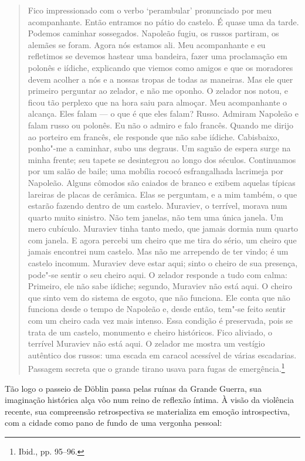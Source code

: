 \begin{quote}
Fico impressionado com o verbo `perambular' pronunciado por meu
acompanhante. Então entramos no pátio do castelo. É quase uma da tarde.
Podemos caminhar sossegados. Napoleão fugiu, os russos partiram, os
alemães se foram. Agora nós estamos ali. Meu acompanhante e eu
refletimos se devemos hastear uma bandeira, fazer uma proclamação em
polonês e iídiche, explicando que viemos como amigos e que os moradores
devem acolher a nós e a nossas tropas de todas as maneiras. Mas ele quer
primeiro perguntar ao zelador, e não me oponho. O zelador nos notou, e
ficou tão perplexo que na hora saiu para almoçar. Meu acompanhante o
alcança. Eles falam --- o que é que eles falam? Russo. Admiram Napoleão e
falam russo ou polonês. Eu não o admiro e falo francês. Quando me dirijo
ao porteiro em francês, ele responde que não sabe iídiche. Cabisbaixo,
ponho"-me a caminhar, subo uns degraus. Um saguão de espera surge na
minha frente; seu tapete se desintegrou ao longo dos séculos.
Continuamos por um salão de baile; uma mobília rococó esfrangalhada
lacrimeja por Napoleão. Alguns cômodos são caiados de branco e exibem
aquelas típicas lareiras de placas de cerâmica. Elas se perguntam, e a
mim também, o que estarão fazendo dentro de um castelo. Muraviev, o
terrível, morava num quarto muito sinistro. Não tem janelas, não tem uma
única janela. Um mero cubículo. Muraviev tinha tanto medo, que jamais
dormia num quarto com janela. E agora percebi um cheiro que me tira do
sério, um cheiro que jamais encontrei num castelo. Mas não me arrependo
de ter vindo; é um castelo incomum. Muraviev deve estar aqui; sinto o
cheiro de sua presença, pode"-se sentir o seu cheiro aqui. O zelador
responde a tudo com calma: Primeiro, ele não sabe iídiche; segundo,
Muraviev não está aqui. O cheiro que sinto vem do sistema de esgoto, que
não funciona. Ele conta que não funciona desde o tempo de Napoleão e,
desde então, tem"-se feito sentir com um cheiro cada vez mais intenso.
Essa condição é preservada, pois se trata de um castelo, monumento e
cheiro históricos. Fico aliviado, o terrível Muraviev não está aqui. O
zelador me mostra um vestígio autêntico dos russos: uma escada em
caracol acessível de várias escadarias. Passagem secreta que o grande
tirano usava para fugas de emergência.\footnote{Ibid., pp. 95--96.}
\end{quote}

Tão logo o passeio de Döblin passa pelas ruínas da Grande Guerra, sua
imaginação histórica alça vôo num reino de reflexão íntima. À visão da
violência recente, sua compreensão retrospectiva se materializa em
emoção introspectiva, com a cidade como pano de fundo de uma vergonha
pessoal:


